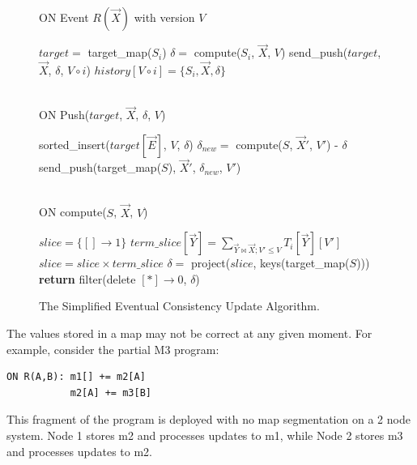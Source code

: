 \documentclass{vldb}
\begin{document}
\begin{figure}
ON Event $R(\vec X)$ with version $V$
\begin{algorithmic}[1]
	\STATE $target =$ target\_map($S_i$)
	\STATE $\delta =$ compute($S_i$, $\vec X$, $V$)
	\IF{$\delta \neq \emptyset$}
    \STATE send\_push($target$, $\vec X$, $\delta$, $V \circ i$)
  \ENDIF
	\STATE $history[V\circ i] = \{S_i, \vec X, \delta\}$ 
\ENDFOR
\end{algorithmic}
\ \\
ON Push($target$, $\vec X$, $\delta$, $V$)
\begin{algorithmic}[1]
  \STATE sorted\_insert($target[\vec E]$, $V$, $\delta$)
\ENDFOR
{}
		\STATE $\delta_{new} =$ compute($S$, $\vec X'$, $V'$) - $\delta$
      \STATE send\_push(target\_map($S$), $\vec X'$, $\delta_{new}$, $V'$)
    \ENDIF
	\ENDIF
\ENDFOR
\end{algorithmic}
\ \\
ON compute($S$, $\vec X$, $V$)
\begin{algorithmic}[1]
\STATE $slice = \{[] \rightarrow 1\}$
\STATE {}
  \STATE {}
  \STATE $term\_slice[\vec Y] = \sum_{\vec Y \bowtie \vec X; V' \leq V} T_i[\vec Y][V']$
  \STATE $slice = slice \times term\_slice$
\ENDFOR
\STATE $\delta =$ project($slice$, keys(target\_map($S$)))
\STATE \textbf{return} filter(delete $[*]\rightarrow 0$, $\delta$)
\end{algorithmic}
\caption{The Simplified Eventual Consistency Update Algorithm.}
\label{fig:eventualconsistency}
\end{figure}

The values stored in a map may not be correct at any given moment.  For example, consider the partial M3 program:
\begin{verbatim}
ON R(A,B): m1[] += m2[A]
           m2[A] += m3[B]
\end{verbatim}
This fragment of the program is deployed with no map segmentation on a 2 node system.  Node 1 stores m2 and processes updates to m1, while Node 2 stores m3 and processes updates to m2.  
\end{document}
